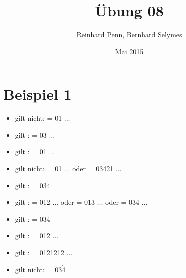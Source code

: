 \documentclass[12pt,a4paper]{article}
\begin{document}
\title{Übung 08}
\author{Reinhard Penn, Bernhard Selymes}
\date{Mai 2015}

\normalsize


\newcommand{\Uebung}{CTL}



\section{Beispiel 1}

\begin{itemize}
	\item gilt nicht: \pi = 01 \(...\)
	\item gilt			: \pi = 03 \(...\)
	\item gilt			: \pi = 01 \(...\)
	\item gilt nicht: \pi = 01 \(...\) oder \pi = 03421 \(...\)
	\item gilt			: \pi = 03\(\dot{4}\)
	\item gilt			: \pi = 012 \(...\) oder \pi = 013 \(...\) oder \pi = 034 \(...\)
	\item gilt			: \pi = 03\(\dot{4}\)
	\item gilt			: \pi = 012 \(...\)
	\item gilt			: \pi = 0121212 \(...\)
	\item gilt nicht: \pi = 03\(\dot{4}\)
\end{itemize}
\end{document}
